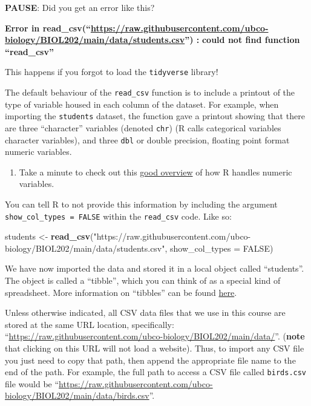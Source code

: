 \documentclass[
]{book}
\newenvironment{Shaded}{\begin{snugshade}}{\end{snugshade}}
\newcommand{\AttributeTok}[1]{\textcolor[rgb]{0.13,0.29,0.53}{#1}}
\newcommand{\ConstantTok}[1]{\textcolor[rgb]{0.56,0.35,0.01}{#1}}
\newcommand{\FunctionTok}[1]{\textcolor[rgb]{0.13,0.29,0.53}{\textbf{#1}}}
\newcommand{\NormalTok}[1]{#1}
\newcommand{\OtherTok}[1]{\textcolor[rgb]{0.56,0.35,0.01}{#1}}
\newcommand{\StringTok}[1]{\textcolor[rgb]{0.31,0.60,0.02}{#1}}
\providecommand{\tightlist}{%
  \setlength{\itemsep}{0pt}\setlength{\parskip}{0pt}}
\begin{document}
\textbf{PAUSE}: Did you get an error like this?

\textbf{Error in read\_csv(``\url{https://raw.githubusercontent.com/ubco-biology/BIOL202/main/data/students.csv}'') : }
\textbf{could not find function ``read\_csv''}

This happens if you forgot to load the \texttt{tidyverse} library!

The default behaviour of the \texttt{read\_csv} function is to include a printout of the type of variable housed in each column of the dataset. For example, when importing the \texttt{students} dataset, the function gave a printout showing that there are three ``character'' variables (denoted \texttt{chr}) (R calls categorical variables character variables), and three \texttt{dbl} or double precision, floating point format numeric variables.

\begin{enumerate}
\def\labelenumi{\arabic{enumi}.}
\tightlist
\item
  Take a minute to check out this \href{https://www.burns-stat.com/documents/tutorials/impatient-r/more-r-key-objects/more-r-numbers/}{good overview} of how R handles numeric variables.
\end{enumerate}

You can tell R to not provide this information by including the argument \texttt{show\_col\_types\ =\ FALSE} within the \texttt{read\_csv} code. Like so:

\begin{Shaded}
\begin{Highlighting}[]
\NormalTok{students }\OtherTok{\textless{}{-}} \FunctionTok{read\_csv}\NormalTok{(}\StringTok{"https://raw.githubusercontent.com/ubco{-}biology/BIOL202/main/data/students.csv"}\NormalTok{,}
                     \AttributeTok{show\_col\_types =} \ConstantTok{FALSE}\NormalTok{)}
\end{Highlighting}
\end{Shaded}

We have now imported the data and stored it in a local object called ``students''. The object is called a ``tibble'', which you can think of as a special kind of spreadsheet. More information on ``tibbles'' can be found \href{https://r4ds.had.co.nz/tibbles.html}{here}.

Unless otherwise indicated, all CSV data files that we use in this course are stored at the same URL location, specifically: ``\url{https://raw.githubusercontent.com/ubco-biology/BIOL202/main/data/}''. (\textbf{note} that clicking on this URL will not load a website). Thus, to import any CSV file you just need to copy that path, then append the appropriate file name to the end of the path. For example, the full path to access a CSV file called \texttt{birds.csv} file would be ``\url{https://raw.githubusercontent.com/ubco-biology/BIOL202/main/data/birds.csv}''.
\end{document}
